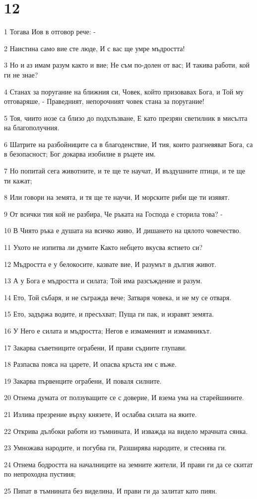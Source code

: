 \chapter{12}

\par 1 Тогава Иов в отговор рече: -
\par 2 Наистина само вие сте люде, И с вас ще умре мъдростта!
\par 3 Но и аз имам разум както и вие; Не съм по-долен от вас; И такива работи, кой ги не знае?
\par 4 Станах за поругание на ближния си, Човек, който призовавах Бога, и Той му отговаряше, - Праведният, непорочният човек стана за поругание!
\par 5 Тоя, чиито нозе са близо до подхлъзване, Е като презрян светилник в мисълта на благополучния.
\par 6 Шатрите на разбойниците са в благоденствие, И тия, които разгневяват Бога, са в безопасност; Бог докарва изобилие в ръцете им.
\par 7 Но попитай сега животните, и те ще те научат, И въздушните птици, и те ще ти кажат;
\par 8 Или говори на земята, и тя ще те научи, И морските риби ще ти изявят.
\par 9 От всички тия кой не разбира, Че ръката на Господа е сторила това? -
\par 10 В Чиято ръка е душата на всичко живо, И дишането на цялото човечество.
\par 11 Ухото не изпитва ли думите Както небцето вкусва ястието си?
\par 12 Мъдростта е у белокосите, казвате вие, И разумът в дългия живот.
\par 13 А у Бога е мъдростта и силата; Той има разсъждение и разум.
\par 14 Ето, Той събаря, и не съгражда вече; Затваря човека, и не му се отваря.
\par 15 Ето, задържа водите, и пресъхват; Пуща ги пак, и изравят земята.
\par 16 У Него е силата и мъдростта; Негов е измаменият и измамникът.
\par 17 Закарва съветниците ограбени, И прави съдиите глупави.
\par 18 Разпасва пояса на царете, И опасва кръста им с въже.
\par 19 Закарва първенците ограбени, И поваля силните.
\par 20 Отнема думата от ползуващите се с доверие, И взема ума на старейшините.
\par 21 Излива презрение върху князете, И ослабва силата на яките.
\par 22 Открива дълбоки работи из тъмнината, И изважда на видело мрачната сянка.
\par 23 Умножава народите, и погубва ги, Разширява народите, и стеснява ги.
\par 24 Отнема бодростта на началниците на земните жители, И прави ги да се скитат по непроходна пустиня;
\par 25 Пипат в тъмнината без виделина, И прави ги да залитат като пиян.


